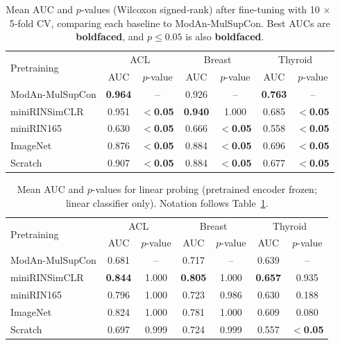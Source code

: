 \documentclass[final,1p,times]{elsarticle}
\newcommand{\revadd}[1]{#1}
\DeclareRobustCommand{\revdel}[1]{}
\begin{document}
\begin{table}[t]
  \centering
  \caption{Mean AUC and $p$‑values (Wilcoxon signed‑rank) after fine‑tuning with 10$\,\times\,$5‑fold CV, comparing each baseline to \revdel{the proposed SSL}\revadd{ModAn‑MulSupCon}.
  Best AUCs are \textbf{boldfaced},
  and $p\le 0.05$ is also \textbf{boldfaced}.}
  \label{tab:finetune_auc}
  \begin{tabular}{lcccccc}
    \toprule
    \multirow{2}{*}{Pretraining} &
      \multicolumn{2}{c}{ACL} &
      \multicolumn{2}{c}{Breast} &
      \multicolumn{2}{c}{Thyroid}\\
    & AUC & $p$-value & AUC & $p$-value & AUC & $p$-value\\
    \midrule
    ModAn-MulSupCon & {\bf 0.964} & -- & 0.926 & -- & {\bf 0.763} & --\\
    miniRINSimCLR       & 0.951 & {\bf$<$0.05} & {\bf0.940} & 1.000 & 0.685 & {\bf$<$0.05}\\
    miniRIN165  & 0.630 & {\bf$<$0.05} & 0.666 & {\bf$<$0.05} & 0.558 & {\bf$<$0.05}\\
    ImageNet     & 0.876 & {\bf$<$0.05} & 0.884 & {\bf$<$0.05} & 0.696 & {\bf$<$0.05}\\
    Scratch      & 0.907 & {\bf$<$0.05} & 0.884 & {\bf$<$0.05} & 0.677 & {\bf$<$0.05}\\

    \bottomrule
  \end{tabular}
\end{table}

\begin{table}[t]
  \centering
  \caption{Mean AUC and $p$-values for linear probing (pretrained encoder frozen; linear classifier only). Notation follows Table~\ref{tab:finetune_auc}.}
  \label{tab:lp_auc}
  \begin{tabular}{lcccccc}
    \toprule
    \multirow{2}{*}{Pretraining} &
      \multicolumn{2}{c}{ACL} &
      \multicolumn{2}{c}{Breast} &
      \multicolumn{2}{c}{Thyroid}\\
    & AUC & $p$-value & AUC & $p$-value & AUC & $p$-value\\
    \midrule
    ModAn-MulSupCon & 0.681 & -- & 0.717 & -- & 0.639 & --\\
    miniRINSimCLR       & {\bf0.844} & 1.000 & {\bf0.805} & 1.000 & {\bf0.657} & 0.935\\
    miniRIN165  & 0.796 & 1.000 & 0.723 & 0.986 & 0.630 & 0.188\\
    ImageNet     & 0.824 & 1.000 & 0.781 & 1.000 & 0.609 & 0.080\\
    Scratch      & 0.697 & 0.999 & 0.724 & 0.999 & 0.557 & {\bf$<$0.05}\\

    \bottomrule
  \end{tabular}
\end{table}
\end{document}
